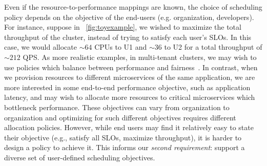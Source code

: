 Even if the resource-to-performance mappings are known,
the choice of scheduling policy depends on the objective of the end-users
(e.g. organization, developers).
For instance, suppose in ~\ref{fig:toyexample}, we wished to maximize the total throughput 
of the cluster, instead of trying to satisfy each user's SLOs.
In this case, we would allocate $\sim$$64$ CPUs to U1 and $\sim$$36$ to U2
for a total throughput of $\sim$$212$ QPS.
As more realistic examples,
in multi-tenant clusters, we may wish to use policies which balance
between performance and fairness~\cite{kelly1998rate,demers1989analysis,ghodsi2011dominant}.
In contrast,
when we provision resources to different microservices of the same application, we are
more interested in some end-to-end performance objective,
such as application latency,
and may wish to allocate more resources to critical microservices which bottleneck performance.
These objectives can vary from organization to organization and optimizing for such different objectives requires different allocation policies.
However, while end users
may find it relatively easy to state their objective
(e.g., satisfy all SLOs, maximize throughput), it is harder to design a policy
to achieve it.
This informs our \emph{second requirement}: support a diverse set of
user-defined scheduling objectives.




